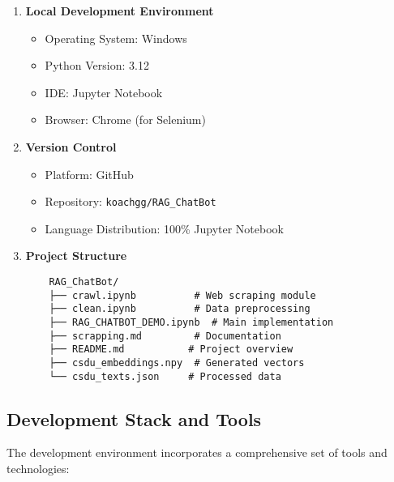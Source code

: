 \documentclass[12pt,a4paper]{report}
\begin{document}
\begin{enumerate}
    \item \textbf{Local Development Environment}
    \begin{itemize}
        \item Operating System: Windows
        \item Python Version: 3.12
        \item IDE: Jupyter Notebook
        \item Browser: Chrome (for Selenium)
    \end{itemize}

    \item \textbf{Version Control}
    \begin{itemize}
        \item Platform: GitHub
        \item Repository: \texttt{koachgg/RAG\_ChatBot}
        \item Language Distribution: 100\% Jupyter Notebook
    \end{itemize}

    \item \textbf{Project Structure}
    \begin{verbatim}
    RAG_ChatBot/
    ├── crawl.ipynb          # Web scraping module
    ├── clean.ipynb          # Data preprocessing
    ├── RAG_CHATBOT_DEMO.ipynb  # Main implementation
    ├── scrapping.md         # Documentation
    ├── README.md           # Project overview
    ├── csdu_embeddings.npy  # Generated vectors
    └── csdu_texts.json     # Processed data
    \end{verbatim}
\end{enumerate}


\subsection{Development Stack and Tools}
The development environment incorporates a comprehensive set of tools and technologies:
\end{document}

